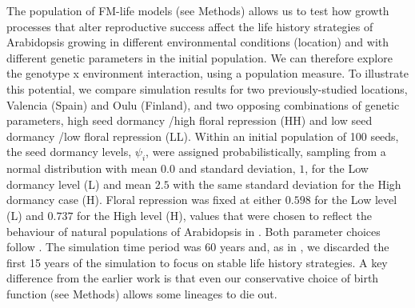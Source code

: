 The population of FM-life models (see Methods) allows us to test how growth
processes that alter reproductive success affect the life history strategies of
Arabidopsis growing in different environmental conditions (location) and with
different genetic parameters in the initial population. We can therefore explore
the genotype x environment interaction, using a population measure. To
illustrate this potential, we compare simulation results for two
previously-studied locations, Valencia (Spain) and Oulu (Finland), and two
opposing combinations of genetic parameters, high seed dormancy /high floral
repression (HH) and low seed dormancy /low floral repression (LL). Within an
initial population of 100 seeds, the seed dormancy levels, \(\psi_{i}\), were
assigned probabilistically, sampling from a normal distribution with mean
\(0.0\) and standard deviation, \(1\), for the Low dormancy level (L) and mean
\(2.5\) with the same standard deviation for the High dormancy case (H). Floral
repression was fixed at either \(0.598\) for the Low level (L) and \(0.737\) for
the High level (H), values that were chosen to reflect the behaviour of natural
populations of Arabidopsis in \citet{wilczek_effects_2009}. Both parameter
choices follow \citet{burghardt_modeling_2015}. The simulation time period was
60 years and, as in \citet{burghardt_modeling_2015}, we discarded the first 15
years of the simulation to focus on stable life history strategies. A key
difference from the earlier work is that even our conservative choice of birth
function (see Methods) allows some lineages to die out.

